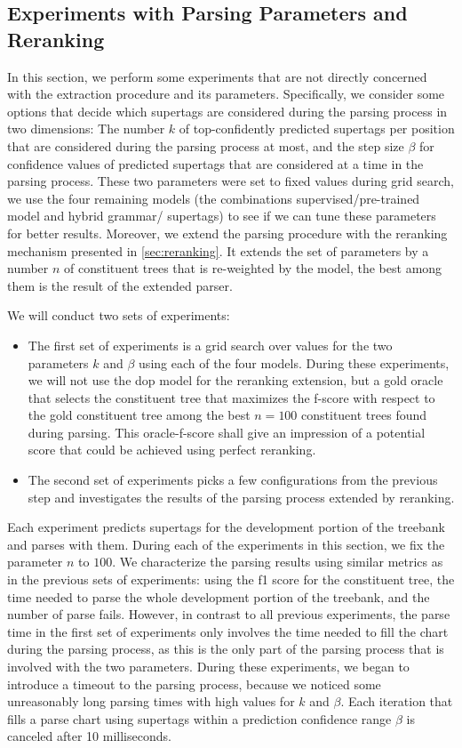 \documentclass[../../document.tex]{subfiles}
\begin{document}
    \subsection{Experiments with Parsing Parameters and Reranking}\label{sec:gridsearch:reranking}
    In this section, we perform some experiments that are not directly concerned with the extraction procedure and its parameters.
    Specifically, we consider some options that decide which supertags are considered during the parsing process in two dimensions:
        The number \(k\) of top-confidently predicted supertags per position that are considered during the parsing process at most, and the step size \(\beta\) for confidence values of predicted supertags that are considered at a time in the parsing process.
    These two parameters were set to fixed values during grid search, we use the four remaining models (the combinations supervised/pre-trained model and hybrid grammar/ supertags) to see if we can tune these parameters for better results.
    Moreover, we extend the parsing procedure with the reranking mechanism presented in \cref{sec:reranking}.
    It extends the set of parameters by a number \(n\) of constituent trees that is re-weighted by the  model, the best among them is the result of the extended parser.

    We will conduct two sets of experiments:
    \begin{itemize}
        \item The first set of experiments is a grid search over values for the two parameters \(k\) and \(\beta\) using each of the four models. During these experiments, we will not use the dop model for the reranking extension, but a gold oracle that selects the constituent tree that maximizes the f-score with respect to the gold constituent tree among the best \(n = 100\) constituent trees found during parsing. This oracle-f-score shall give an impression of a potential score that could be achieved using perfect reranking.
        \item The second set of experiments picks a few configurations from the previous step and investigates the results of the parsing process extended by reranking.
    \end{itemize}
    Each experiment predicts supertags for the development portion of the treebank and parses with them.
    During each of the experiments in this section, we fix the parameter \(n\) to \(100\).
    We characterize the parsing results using similar metrics as in the previous sets of experiments: using the f1 score for the constituent tree, the time needed to parse the whole development portion of the treebank, and the number of parse fails.
    However, in contrast to all previous experiments, the parse time in the first set of experiments only involves the time needed to fill the chart during the parsing process, as this is the only part of the parsing process that is involved with the two parameters.
    During these experiments, we began to introduce a timeout to the parsing process, because we noticed some unreasonably long parsing times with high values for \(k\) and \(\beta\). Each iteration that fills a parse chart using supertags within a prediction confidence range \(\beta\) is canceled after 10 milliseconds.
\end{document}
